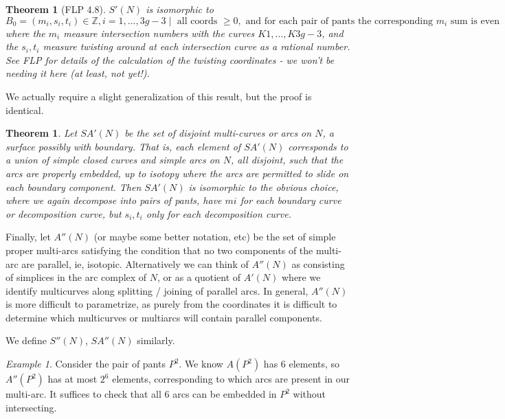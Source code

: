 \documentclass[12pt]{amsart}
\newtheorem{thm}[theorem]{Theorem}
\theoremstyle{definition}
\theoremstyle{remark}
\newtheorem{example}[theorem]{Example}
\begin{document}
{\begin{thm}[FLP 4.8]
$S'(N)$ is isomorphic to $B_0 = {(m_i,s_i,t_i) \in \mathbb{Z}, i = 1,...,3g-3
\mid \text{ all coords }\geq 0, \text{ and for each pair of pants the
corresponding }m_i \text{ sum is even}}$ where the $m_i$ measure intersection
numbers with the curves $K1,...,K3g-3$, and the $s_i,t_i$ measure twisting
around at each intersection curve as a rational number.  See FLP for details of
the calculation of the twisting coordinates - we won't be needing it here (at
least, not yet!).

\end{thm}

We actually require a slight generalization of this result, but the proof is
identical.

\begin{thm}

Let $SA'(N)$ be the set of disjoint multi-curves or arcs on $N$, a surface
possibly with boundary. That is, each element of $SA'(N)$ corresponds to
a union of simple closed curves and simple arcs on $N$, all disjoint, such that
the arcs are properly embedded, up to isotopy where the arcs are permitted to
slide on each boundary component. Then $SA'(N)$ is isomorphic to the obvious
choice, where we again decompose into pairs of pants, have $mi$ for each
boundary curve or decomposition curve, but $s_i,t_i$ only for each
decomposition curve.

\end{thm}

Finally, let $A''(N)$ (or maybe some better notation, etc) be the set of simple
proper multi-arcs satisfying the condition that no two components of the
multi-arc are parallel, ie, isotopic. Alternatively we can think of $A''(N)$ as
consisting of simplices in the arc complex of $N$, or as a quotient of $A'(N)$
where we identify multicurves along splitting / joining of parallel arcs. In
general, $A''(N)$ is more difficult to parametrize, as purely from the
coordinates it is difficult to determine which multicurves or multiarcs will
contain parallel components.

We define $S''(N)$, $SA''(N)$ similarly.

\begin{example}

Consider the pair of pants $P^2$. We know $A(P^2)$ has 6 elements, so
$A''(P^2)$ has at most $2^6$ elements, corresponding to which arcs are present
in our multi-arc. It suffices to check that all 6 arcs can be embedded in $P^2$
without intersecting.

\end{example}

}
\end{document}
